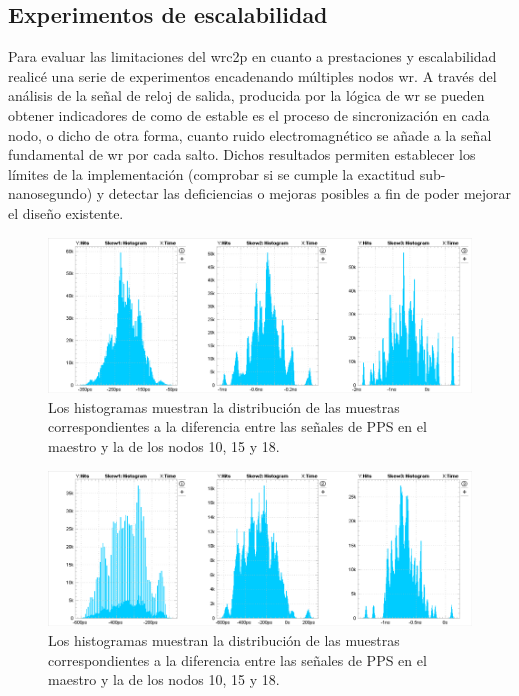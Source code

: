 \subsection{Experimentos de escalabilidad}

Para evaluar las limitaciones del \gls{wrc2p} en cuanto a prestaciones y 
escalabilidad realicé una serie de experimentos encadenando múltiples nodos 
\gls{wr}. A través del análisis de la señal de reloj de salida, producida por 
la lógica de \gls{wr} se pueden obtener indicadores de como de estable es el 
proceso de sincronización en cada nodo, o dicho de otra forma, cuanto ruido 
electromagnético se añade a la señal fundamental de \gls{wr} por cada salto. 
Dichos resultados permiten establecer los límites de la implementación 
(comprobar si se cumple la exactitud sub-nanosegundo) y detectar las 
deficiencias o mejoras posibles a fin de poder mejorar el diseño existente.



\begin{figure}
	\centering
	\includegraphics[width=0.7\linewidth]{imagenes/hist_exp1}
	\caption[Histograma para cadena de 18 WR-LEN]{Los histogramas muestran la 
	distribución de las muestras correspondientes a la diferencia entre las 
	señales de PPS en el maestro y la de los nodos 10, 15 y 18.}
	\label{fig:histexp1}
\end{figure}

\begin{figure}
	\centering
	\includegraphics[width=0.7\linewidth]{imagenes/hist_exp3}
	\caption[Histograma para cadena de 18 WR-LEN]{Los histogramas muestran la 
		distribución de las muestras correspondientes a la diferencia entre las 
		señales de PPS en el maestro y la de los nodos 10, 15 y 18.}
	\label{fig:histexp2}
\end{figure}

